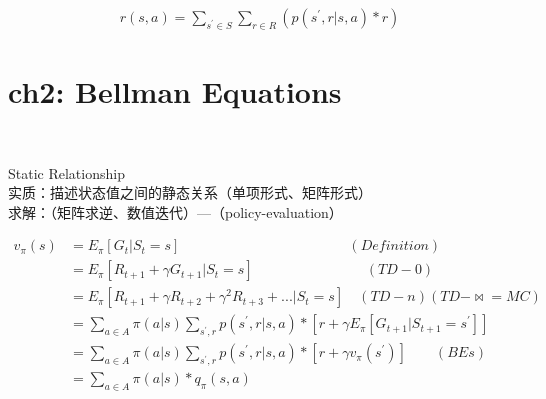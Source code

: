 \documentclass{article}
\begin{document}
\begin{align*}
    r(s, a) = \sum_{s^{\prime} \in S} 
    \sum_{r \in R} 
    \left( p \left( s^{\prime}, r | s, a \right) * r \right) 
\end{align*}


\newpage
\section*{ch2: Bellman Equations}


~ \\[3pt]
\begin{CJK}{UTF8}{gbsn}
    Static Relationship \\[3pt]
    实质：描述状态值之间的静态关系（单项形式、矩阵形式） \\[3pt]
    求解：（矩阵求逆、数值迭代）---（policy-evaluation） \\[3pt]
\end{CJK}


\begin{align*}
    v_{\pi}(s) 
      &= E_{\pi} \left[ G_{t} | S_{t}=s \right] 
         \qquad \qquad \qquad \qquad \qquad \qquad (Definition) \\[3pt]
      &= E_{\pi} \left[ R_{t+1} + \gamma G_{t+1} | S_{t}=s \right] 
         \qquad \qquad \qquad \qquad (TD-0) \\[3pt]
      &= E_{\pi} \left[ R_{t+1} + \gamma R_{t+2} + \gamma^2 R_{t+3} + ... 
         | S_{t}=s \right] 
         \quad (TD-n)(TD-\Join =MC) \\[3pt]
      &= \sum_{a \in A} \pi(a | s) 
         \sum_{s^{\prime}, r} 
         p \left( s^{\prime}, r | s, a \right) * 
         \left[ r + \gamma E_{\pi} 
         \left[ G_{t+1} | S_{t+1}=s^{\prime} \right] \right] \\[3pt]
      &= \sum_{a \in A} \pi(a | s) 
         \sum_{s^{\prime}, r} 
         p \left( s^{\prime}, r | s, a \right) * 
         \left[ r + \gamma 
         v_{\pi} \left( s^{\prime} \right) \right] 
         \qquad (BEs) \\[3pt]
      &= \sum_{a \in A} 
         \pi(a | s) * q_{\pi}(s, a) \\[3pt]
\end{align*}
\end{document}
